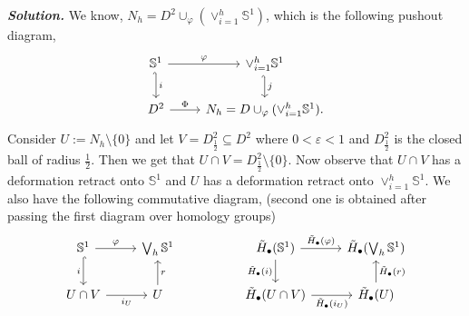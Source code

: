 \documentclass[11pt]{article}
\newcommand{\bb}[1]{\mathbb{#1}}
\newcommand{\s}{\bb{S}}
\newcommand{\sol}{ \textbf{\textit{Solution.}} }
\begin{document}
 \sol  We know, $N_h = D^2 \cup_{\varphi} (\vee_{i=1}^{h} \s^1)$, which is the following pushout diagram, 
 \[\begin{tikzcd}
     {\s^1} & {\vee_{i=1}^{h}\s^1} \\
     {D^2} & {N_h = D \cup_{\varphi}(\vee_{i=1}^{h}\s^1).}
     \arrow["i", hook', from=1-1, to=2-1]
     \arrow["\varphi", from=1-1, to=1-2]
     \arrow["\Phi", from=2-1, to=2-2]
     \arrow["j", hook', from=1-2, to=2-2]
 \end{tikzcd}\]
 Consider $U := N_h \setminus \{0\}$ and let $V = D^2_{\frac{1}{2}} \subseteq D^2$ where $0 < \varepsilon < 1$ and $D^2_{\frac{1}{2}}$ is the closed ball of radius $\frac{1}{2}$. Then we get that $U \cap V = D^2_{\frac{1}{2}} \setminus \{0\}$. Now observe that $U \cap V$ has a deformation retract onto $\s^1$ and $U$ has a deformation retract onto $\vee_{i=1}^{h} \s^1$. We also have the following commutative diagram, (second one is obtained after passing the first diagram over homology groups)
 \[\begin{tikzcd}
	{\s^1} & {\bigvee_h \s^1} && {\tilde{H}_{\bullet}(\s^1)} & {\tilde{H}_{\bullet}(\bigvee_h \s^1)} \\
	{U \cap V} & U && {\tilde{H}_{\bullet}(U \cap V)} & {\tilde{H}_{\bullet}(U)}
	\arrow["{i_U}"', from=2-1, to=2-2]
	\arrow["i"', hook, from=1-1, to=2-1]
	\arrow["\varphi", from=1-1, to=1-2]
	\arrow["{\tilde{H}_{\bullet}(i)}"', from=1-4, to=2-4]
	\arrow["{\tilde{H}_{\bullet}(i_U)}"', from=2-4, to=2-5]
	\arrow["{\tilde{H}_{\bullet}(r)}"', from=2-5, to=1-5]
	\arrow["{\tilde{H}_{\bullet}(\varphi)}", from=1-4, to=1-5]
	\arrow["r"', from=2-2, to=1-2]
\end{tikzcd}\]
\end{document}

